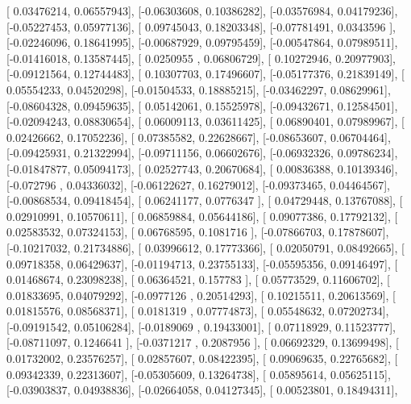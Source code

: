 \documentclass{article}
\begin{document}
       [ 0.03476214,  0.06557943],
       [-0.06303608,  0.10386282],
       [-0.03576984,  0.04179236],
       [-0.05227453,  0.05977136],
       [ 0.09745043,  0.18203348],
       [-0.07781491,  0.0343596 ],
       [-0.02246096,  0.18641995],
       [-0.00687929,  0.09795459],
       [-0.00547864,  0.07989511],
       [-0.01416018,  0.13587445],
       [ 0.0250955 ,  0.06806729],
       [ 0.10272946,  0.20977903],
       [-0.09121564,  0.12744483],
       [ 0.10307703,  0.17496607],
       [-0.05177376,  0.21839149],
       [ 0.05554233,  0.04520298],
       [-0.01504533,  0.18885215],
       [-0.03462297,  0.08629961],
       [-0.08604328,  0.09459635],
       [ 0.05142061,  0.15525978],
       [-0.09432671,  0.12584501],
       [-0.02094243,  0.08830654],
       [ 0.06009113,  0.03611425],
       [ 0.06890401,  0.07989967],
       [ 0.02426662,  0.17052236],
       [ 0.07385582,  0.22628667],
       [-0.08653607,  0.06704464],
       [-0.09425931,  0.21322994],
       [-0.09711156,  0.06602676],
       [-0.06932326,  0.09786234],
       [-0.01847877,  0.05094173],
       [ 0.02527743,  0.20670684],
       [ 0.00836388,  0.10139346],
       [-0.072796  ,  0.04336032],
       [-0.06122627,  0.16279012],
       [-0.09373465,  0.04464567],
       [-0.00868534,  0.09418454],
       [ 0.06241177,  0.0776347 ],
       [ 0.04729448,  0.13767088],
       [ 0.02910991,  0.10570611],
       [ 0.06859884,  0.05644186],
       [ 0.09077386,  0.17792132],
       [ 0.02583532,  0.07324153],
       [ 0.06768595,  0.1081716 ],
       [-0.07866703,  0.17878607],
       [-0.10217032,  0.21734886],
       [ 0.03996612,  0.17773366],
       [ 0.02050791,  0.08492665],
       [ 0.09718358,  0.06429637],
       [-0.01194713,  0.23755133],
       [-0.05595356,  0.09146497],
       [ 0.01468674,  0.23098238],
       [ 0.06364521,  0.157783  ],
       [ 0.05773529,  0.11606702],
       [ 0.01833695,  0.04079292],
       [-0.0977126 ,  0.20514293],
       [ 0.10215511,  0.20613569],
       [ 0.01815576,  0.08568371],
       [ 0.0181319 ,  0.07774873],
       [ 0.05548632,  0.07202734],
       [-0.09191542,  0.05106284],
       [-0.0189069 ,  0.19433001],
       [ 0.07118929,  0.11523777],
       [-0.08711097,  0.1246641 ],
       [-0.0371217 ,  0.2087956 ],
       [ 0.06692329,  0.13699498],
       [ 0.01732002,  0.23576257],
       [ 0.02857607,  0.08422395],
       [ 0.09069635,  0.22765682],
       [ 0.09342339,  0.22313607],
       [-0.05305609,  0.13264738],
       [ 0.05895614,  0.05625115],
       [-0.03903837,  0.04938836],
       [-0.02664058,  0.04127345],
       [ 0.00523801,  0.18494311],
\end{document}
